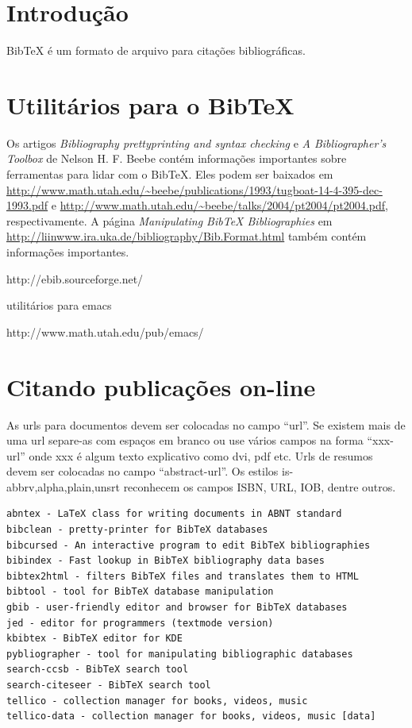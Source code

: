 \documentclass[12pt,brazil]{book}
\begin{document}
\section{Introdução}
\label{sec:introducao-1}

BibTeX é um formato de arquivo para citações bibliográficas.

\section{Utilitários para o BibTeX}
\label{sec:utilitarios-para-o}

Os artigos \textit{Bibliography prettyprinting and syntax checking} e
\textit{A Bibliographer's Toolbox} de Nelson H. F. Beebe contém
informações importantes sobre ferramentas para lidar com o BibTeX.
Eles podem ser baixados em
\url{http://www.math.utah.edu/~beebe/publications/1993/tugboat-14-4-395-dec-1993.pdf}
 e \url{http://www.math.utah.edu/~beebe/talks/2004/pt2004/pt2004.pdf},
respectivamente. A página \textit{Manipulating BibTeX Bibliographies}
em \url{http://liinwww.ira.uka.de/bibliography/Bib.Format.html} também
contém informações importantes.

http://ebib.sourceforge.net/

utilitários para emacs

http://www.math.utah.edu/pub/emacs/

\section{Citando publicações on-line}
\label{sec:citando-publ-line}

As urls para documentos devem ser colocadas no campo ``url''. Se
existem mais de uma url separe-as com espaços em branco ou use vários
campos na forma ``xxx-url'' onde xxx é algum texto explicativo como
dvi, pdf etc. Urls de resumos devem ser colocadas no campo
``abstract-url''. Os estilos is-{abbrv,alpha,plain,unsrt} reconhecem
os campos ISBN, URL, IOB, dentre outros.

\begin{verbatim}
abntex - LaTeX class for writing documents in ABNT standard
bibclean - pretty-printer for BibTeX databases
bibcursed - An interactive program to edit BibTeX bibliographies
bibindex - Fast lookup in BibTeX bibliography data bases
bibtex2html - filters BibTeX files and translates them to HTML
bibtool - tool for BibTeX database manipulation
gbib - user-friendly editor and browser for BibTeX databases
jed - editor for programmers (textmode version)
kbibtex - BibTeX editor for KDE
pybliographer - tool for manipulating bibliographic databases
search-ccsb - BibTeX search tool
search-citeseer - BibTeX search tool
tellico - collection manager for books, videos, music
tellico-data - collection manager for books, videos, music [data]
\end{verbatim}
\end{document}
